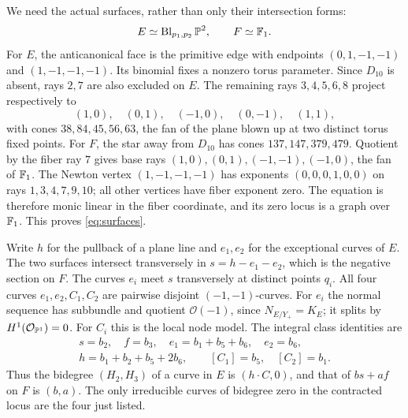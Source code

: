 We need the actual surfaces, rather than only their intersection forms:
\begin{equation}\label{eq:surfaces}
 E\simeq\operatorname{Bl}_{p_1,p_2}\mathbb P^2,\qquad F\simeq\mathbb F_1.
\end{equation}
For $E$, the anticanonical face is the primitive edge with endpoints
$(0,1,-1,-1)$ and $(1,-1,-1,-1)$. Its binomial fixes a nonzero torus
parameter. Since $D_{10}$ is absent, rays $2,7$ are also excluded
on $E$. The remaining rays $3,4,5,6,8$ project respectively to
\[
 (1,0),\quad(0,1),\quad(-1,0),\quad(0,-1),\quad(1,1),
\]
with cones
$38,84,45,56,63$, the fan of the plane blown up at two distinct
torus fixed points.
For $F$, the star away from $D_{10}$ has cones
$137,147,379,479$. Quotient by the fiber ray $7$ gives base rays
$(1,0),(0,1),(-1,-1),(-1,0)$, the fan of $\mathbb F_1$.
The Newton vertex $(1,-1,-1,-1)$ has exponents
$(0,0,0,1,0,0)$ on rays $1,3,4,7,9,10$; all other vertices have
fiber exponent zero. The equation is therefore monic linear in the
fiber coordinate, and its zero locus is a graph over $\mathbb F_1$.
This proves \eqref{eq:surfaces}.

Write $h$ for the pullback of a plane line and $e_1,e_2$ for the
exceptional curves of $E$. The two surfaces intersect transversely in
$s=h-e_1-e_2$, which is the negative section on $F$. The curves
$e_i$ meet $s$ transversely at distinct points $q_i$. All four curves
$e_1,e_2,C_1,C_2$ are pairwise disjoint $(-1,-1)$-curves.
For $e_i$ the normal sequence has subbundle and quotient
$\mathcal O(-1)$, since $N_{E/Y_+}=K_E$; it splits by
$H^1(\mathcal O_{\mathbb P^1})=0$. For $C_i$ this is the local node model.
The integral class identities are
\begin{equation}\label{eq:surface-classes}
 \begin{gathered}
 s=b_2,\quad f=b_3,\quad e_1=b_1+b_5+b_6,\quad e_2=b_6,\\
 h=b_1+b_2+b_5+2b_6,\qquad [C_1]=b_5,\quad[C_2]=b_1.
 \end{gathered}
\end{equation}
Thus the bidegree $(H_2,H_3)$ of a curve in $E$ is $(h\cdot C,0)$,
and that of $bs+af$ on $F$ is $(b,a)$. The only irreducible curves
of bidegree zero in the contracted locus are the four just listed.

